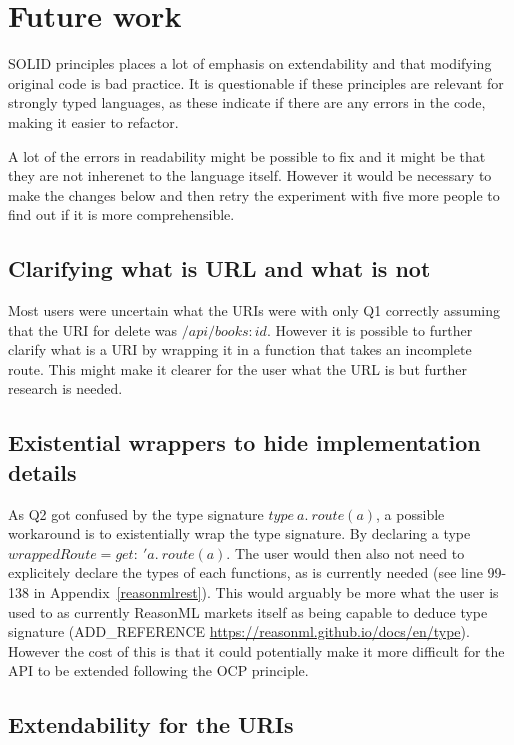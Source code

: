 \section{Future work}\label{futurework}

SOLID principles places a lot of emphasis on extendability and that modifying
original code is bad practice. It is questionable if these principles are
relevant for strongly typed languages, as these indicate if there are any
errors in the code, making it easier to refactor.

A lot of the errors in readability might be possible to fix and it might be
that they are not inherenet to the language itself. However it would be
necessary to make the changes below and then retry the experiment with five 
more people to find out if it is more comprehensible. 

\subsection{Clarifying what is URL and what is not}

Most users were uncertain what the URIs were with only Q1 correctly assuming
that the URI for delete was $/api/books:id$. However it is possible to further
clarify what is a URI by wrapping it in a function that takes an incomplete
route. This might make it clearer for the user what the URL is but further
research is needed.

\subsection{Existential wrappers to hide implementation details}

As Q2 got confused by the type signature $type\ a.\ route(a)$, a possible
workaround is to existentially wrap the type signature.  By declaring a type
$wrappedRoute = {get :\ 'a.\ route(a)}$. The user would then also not need to
explicitely declare the types of each functions, as is currently needed (see
line 99-138 in Appendix~\ref{reasonmlrest}). This would arguably be more what
the user is used to as currently ReasonML markets itself as being capable to
deduce type signature (ADD\_REFERENCE
\url{https://reasonml.github.io/docs/en/type}). However the cost of this is
that it could potentially make it more difficult for the API to be extended
following the OCP principle. 

\subsection{Extendability for the URIs}

